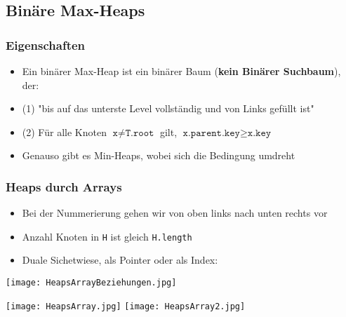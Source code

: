 	\newpage
	\subsection{Binäre Max-Heaps}
		\subsubsection{Eigenschaften}
			\begin{itemize}
				\item Ein binärer Max-Heap ist ein binärer Baum (\textbf{kein Binärer Suchbaum}), der:
				\item (1) "bis auf das unterste Level vollständig und von Links gefüllt ist"
				\item (2) Für alle Knoten $\texttt{x} \neq \texttt{T.root}$ gilt, 
					$\texttt{x.parent.key} \geq \texttt{x.key}$
				\item Genauso gibt es Min-Heaps, wobei sich die Bedingung umdreht
			\end{itemize}


		\subsubsection{Heaps durch Arrays}
			\begin{minipage}{0.5\textwidth}
				\begin{itemize}
					\item Bei der Nummerierung gehen wir von oben links nach unten rechts vor
					\item Anzahl Knoten in \texttt{H} ist gleich \texttt{H.length}
					\item Duale Sichetwiese, als Pointer oder als Index:
				\end{itemize}

				\begin{center}
					\texttt{[image: HeapsArrayBeziehungen.jpg]}
				\end{center}
			\end{minipage}
			\begin{minipage}{0.45\textwidth}
				\begin{center}
					\texttt{[image: HeapsArray.jpg]}
					\texttt{[image: HeapsArray2.jpg]}
				\end{center}
			\end{minipage}


